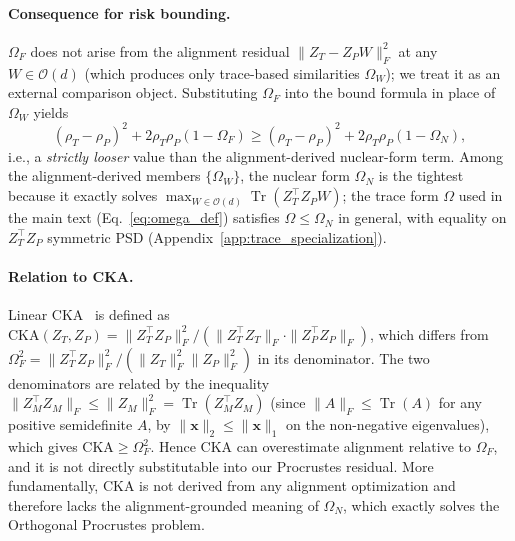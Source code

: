 \paragraph{Consequence for risk bounding.}
$\Omega_F$ does not arise from the alignment residual $\|Z_T - Z_P W\|_F^2$ at any $W \in \mathcal{O}(d)$ (which produces only trace-based similarities $\Omega_W$); we treat it as an external comparison object. Substituting $\Omega_F$ into the bound formula in place of $\Omega_W$ yields
\begin{equation}
(\rho_T - \rho_P)^2 + 2\rho_T\rho_P(1 - \Omega_F) \ge (\rho_T - \rho_P)^2 + 2\rho_T\rho_P(1 - \Omega_N),
\end{equation}
i.e., a \emph{strictly looser} value than the alignment-derived nuclear-form term. Among the alignment-derived members $\{\Omega_W\}$, the nuclear form $\Omega_N$ is the tightest because it exactly solves $\max_{W \in \mathcal{O}(d)} \operatorname{Tr}(Z_T^\top Z_P W)$; the trace form $\Omega$ used in the main text (Eq.~\ref{eq:omega_def}) satisfies $\Omega \le \Omega_N$ in general, with equality on $Z_T^\top Z_P$ symmetric PSD (Appendix~\ref{app:trace_specialization}).

\paragraph{Relation to CKA.}
Linear CKA~\citep{kornblith2019similarity} is defined as $\mathrm{CKA}(Z_T, Z_P) = \|Z_T^\top Z_P\|_F^2 / (\|Z_T^\top Z_T\|_F \cdot \|Z_P^\top Z_P\|_F)$, which differs from $\Omega_F^2 = \|Z_T^\top Z_P\|_F^2 / (\|Z_T\|_F^2 \|Z_P\|_F^2)$ in its denominator. The two denominators are related by the inequality $\|Z_M^\top Z_M\|_F \le \|Z_M\|_F^2 = \operatorname{Tr}(Z_M^\top Z_M)$ (since $\|A\|_F \le \operatorname{Tr}(A)$ for any positive semidefinite $A$, by $\|\mathbf{x}\|_2 \le \|\mathbf{x}\|_1$ on the non-negative eigenvalues), which gives $\mathrm{CKA} \ge \Omega_F^2$. Hence CKA can overestimate alignment relative to $\Omega_F$, and it is not directly substitutable into our Procrustes residual. More fundamentally, CKA is not derived from any alignment optimization and therefore lacks the alignment-grounded meaning of $\Omega_N$, which exactly solves the Orthogonal Procrustes problem.
